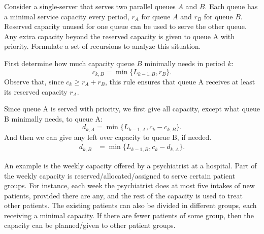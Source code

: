 \begin{extra}  Consider a single-server that serves two parallel queues $A$ and $B$.
 Each queue has a minimal service capacity every period, $r_A$ for queue $A$ and $r_B$ for queue $B$.
 Reserved capacity unused for one queue can be used to serve the other queue.
 Any extra capacity beyond the reserved capacity is given to queue A with priority.
 Formulate a set of recursions to analyze this situation.
\begin{solution}
 First determine how much capacity queue $B$ minimally needs in
 period $k$:
 \begin{equation*}
 c_{k,B} = \min\{L_{ k-1, B}, r_B\}.
 \end{equation*}
 Observe that, since $c_k \geq r_A + r_B$, this rule ensures that
 queue A receives at least its reserved capacity $r_A$. 

 Since queue A is served with priority, we first give all capacity,
 except what queue B minimally needs, to queue A:
 \begin{equation*}
d_{k,A} = \min\{L_{k-1, A}, c_k-c_{k,B}\}.
\end{equation*}
And then we can give any left over capacity to queue B, if needed. 
\begin{align*}
d_{k,B} &= \min\{L_{k-1, B}, c_k-d_{k,A}\}.
\end{align*}

An example is the weekly capacity offered by a psychiatrist at a hospital.
Part of the weekly capacity is reserved/allocated/assigned to serve certain patient groups.
For instance, each week the psychiatrist does at most five intakes of new patients, provided there are any, and the rest of the capacity is used to treat other patients.
The existing patients can also be divided in different groups, each receiving a minimal capacity.
If there are fewer patients of some group, then the capacity can be planned/given to other patient groups.
\end{solution}
\end{extra}


